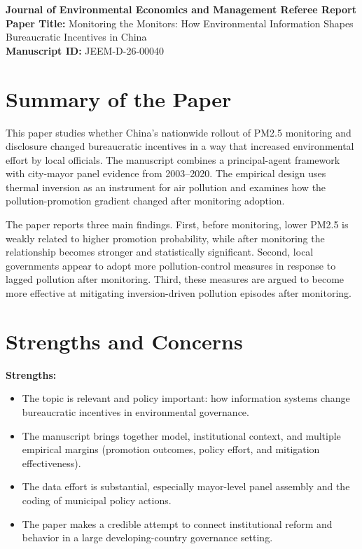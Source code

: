 \documentclass[12pt]{article}
\begin{document}
\begin{center}
    \Large \textbf{Journal of Environmental Economics and Management Referee Report}\\[1ex]
    \large \textbf{Paper Title:} Monitoring the Monitors: How Environmental Information Shapes Bureaucratic Incentives in China\\
    \large \textbf{Manuscript ID:} JEEM-D-26-00040
\end{center}

\section{Summary of the Paper}

This paper studies whether China's nationwide rollout of PM2.5 monitoring and disclosure changed bureaucratic incentives in a way that increased environmental effort by local officials. The manuscript combines a principal-agent framework with city-mayor panel evidence from 2003--2020. The empirical design uses thermal inversion as an instrument for air pollution and examines how the pollution-promotion gradient changed after monitoring adoption.

The paper reports three main findings. First, before monitoring, lower PM2.5 is weakly related to higher promotion probability, while after monitoring the relationship becomes stronger and statistically significant. Second, local governments appear to adopt more pollution-control measures in response to lagged pollution after monitoring. Third, these measures are argued to become more effective at mitigating inversion-driven pollution episodes after monitoring.

\section{Strengths and Concerns}

\textbf{Strengths:}
\begin{itemize}
    \item The topic is relevant and policy important: how information systems change bureaucratic incentives in environmental governance.
    \item The manuscript brings together model, institutional context, and multiple empirical margins (promotion outcomes, policy effort, and mitigation effectiveness).
    \item The data effort is substantial, especially mayor-level panel assembly and the coding of municipal policy actions.
    \item The paper makes a credible attempt to connect institutional reform and behavior in a large developing-country governance setting.
\end{itemize}
\end{document}
